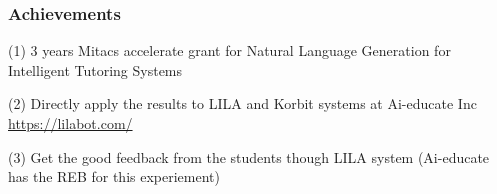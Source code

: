 \documentclass{beamer}
\begin{document}
\begin{frame}
\frametitle{Achievements}
(1) 3 years Mitacs accelerate grant for Natural Language Generation for Intelligent Tutoring Systems \\
\begin{center}
	
\end{center}
(2) Directly apply the results to LILA and Korbit systems at Ai-educate Inc \\

\url{https://lilabot.com/} \\

\begin{center}
	
\end{center}
(3) Get the good feedback from the students though LILA system (Ai-educate has the REB for this experiement)



\end{frame}
\end{document}
